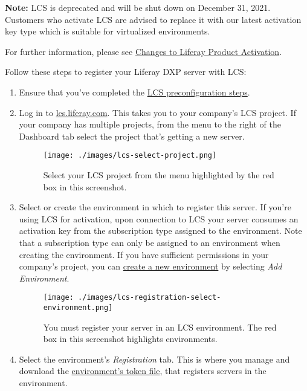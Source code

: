 \noindent\hrulefill

\textbf{Note:} LCS is deprecated and will be shut down on December 31,
2021. Customers who activate LCS are advised to replace it with our
latest activation key type which is suitable for virtualized
environments.

For further information, please see
\href{https://help.liferay.com/hc/en-us/articles/4402347960845-Changes-to-Liferay-Product-Activation}{Changes
to Liferay Product Activation}.

\noindent\hrulefill

Follow these steps to register your Liferay DXP server with LCS:

\begin{enumerate}
\def\labelenumi{\arabic{enumi}.}
\item
  Ensure that you've completed the
  \href{/docs/7-2/deploy/-/knowledge_base/d/lcs-preconfiguration}{LCS
  preconfiguration steps}.
\item
  Log in to \href{https://lcs.liferay.com}{lcs.liferay.com}. This takes
  you to your company's LCS project. If your company has multiple
  projects, from the menu to the right of the Dashboard tab select the
  project that's getting a new server.

  \begin{figure}
  \centering
  \texttt{[image: ./images/lcs-select-project.png]}
  \caption{Select your LCS project from the menu highlighted by the red
  box in this screenshot.}
  \end{figure}
\item
  Select or create the environment in which to register this server. If
  you're using LCS for activation, upon connection to LCS your server
  consumes an activation key from the subscription type assigned to the
  environment. Note that a subscription type can only be assigned to an
  environment when creating the environment. If you have sufficient
  permissions in your company's project, you can
  \href{/docs/7-2/deploy/-/knowledge_base/d/managing-lcs-environments\#creating-environments}{create
  a new environment} by selecting \emph{Add Environment}.

  \begin{figure}
  \centering
  \texttt{[image: ./images/lcs-registration-select-environment.png]}
  \caption{You must register your server in an LCS environment. The red
  box in this screenshot highlights environments.}
  \end{figure}
\item
  Select the environment's \emph{Registration} tab. This is where you
  manage and download the
  \href{/docs/7-2/deploy/-/knowledge_base/d/understanding-environment-tokens}{environment's
  token file}, that registers servers in the environment.


\end{enumerate}
